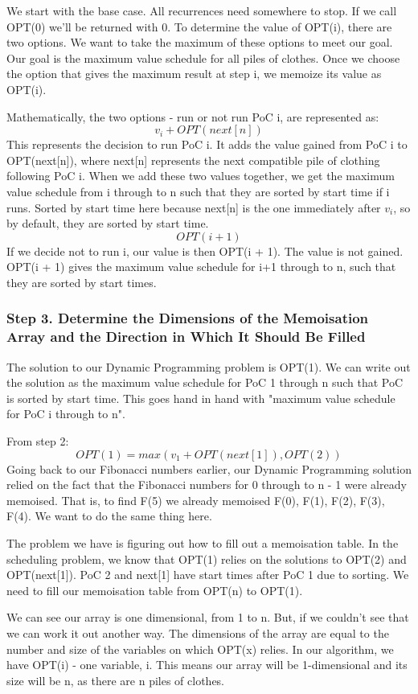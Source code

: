 \documentclass{article}
\begin{document}
We start with the base case. All recurrences need somewhere to stop. If we call OPT(0) we'll be returned with 0.
To determine the value of OPT(i), there are two options. We want to take the maximum of these options to meet our goal. Our goal is the maximum value schedule for all piles of clothes. Once we choose the option that gives the maximum result at step i, we memoize its value as OPT(i).

Mathematically, the two options - run or not run PoC i, are represented as:
$$v_i + OPT(next[n])$$
This represents the decision to run PoC i. It adds the value gained from PoC i to OPT(next[n]), where next[n] represents the next compatible pile of clothing following PoC i. When we add these two values together, we get the maximum value schedule from i through to n such that they are sorted by start time if i runs.
Sorted by start time here because next[n] is the one immediately after $v_i$, so by default, they are sorted by start time.
$$OPT(i + 1)$$
If we decide not to run i, our value is then OPT(i + 1). The value is not gained. OPT(i + 1) gives the maximum value schedule for i+1 through to n, such that they are sorted by start times. 
\newpage
\subsubsection{Step 3. Determine the Dimensions of the Memoisation Array and the Direction in Which It Should Be Filled}
The solution to our Dynamic Programming problem is OPT(1). We can write out the solution as the maximum value schedule for PoC 1 through n such that PoC is sorted by start time. This goes hand in hand with "maximum value schedule for PoC i through to n". 

From step 2:
$$OPT(1) = max(v_1 + OPT(next[1]), OPT(2))$$
Going back to our Fibonacci numbers earlier, our Dynamic Programming solution relied on the fact that the Fibonacci numbers for 0 through to n - 1 were already memoised. That is, to find F(5) we already memoised F(0), F(1), F(2), F(3), F(4). We want to do the same thing here.

The problem we have is figuring out how to fill out a memoisation table. In the scheduling problem, we know that OPT(1) relies on the solutions to OPT(2) and OPT(next[1]). PoC 2 and next[1] have start times after PoC 1 due to sorting. We need to fill our memoisation table from OPT(n) to OPT(1).

We can see our array is one dimensional, from 1 to n. But, if we couldn't see that we can work it out another way. The dimensions of the array are equal to the number and size of the variables on which OPT(x) relies. In our algorithm, we have OPT(i) - one variable, i. This means our array will be 1-dimensional and its size will be n, as there are n piles of clothes.
\end{document}
